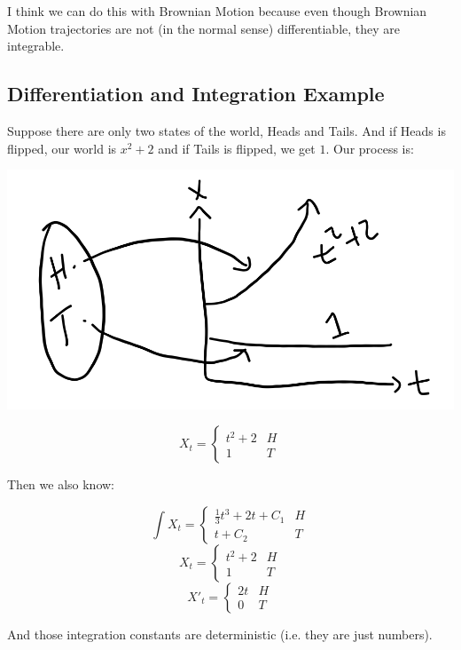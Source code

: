 \documentclass{article}
\begin{document}
I think we can do this with Brownian Motion because even though Brownian Motion trajectories are not (in the normal sense) differentiable, they are integrable.

\subsection{Differentiation and Integration Example}
Suppose there are only two states of the world, Heads and Tails.  And if Heads is flipped, our world is $x^2 + 2$ and if Tails is flipped, we get $1$.  Our process is:

\includegraphics[width=\textwidth]{ExampleProcess.png}

\[X_t = \begin{cases} 
    t^2 + 2 & H \\
    1 & T 
 \end{cases}
\]

Then we also know:

\[\int X_t = \begin{cases} 
    \frac{1}{3}t^3 + 2t + C_1 & H \\
    t + C_2 & T 
 \end{cases}
\]
\[X_t = \begin{cases} 
    t^2 + 2 & H \\
    1 & T 
 \end{cases}
\]
\[X'_t = \begin{cases} 
    2t & H \\
    0 & T 
 \end{cases}
\]

And those integration constants are deterministic (i.e. they are just numbers).
\end{document}
